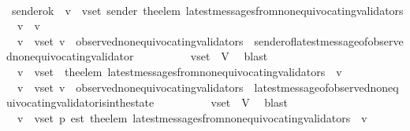 \begin{isabellebody}
\ \ \isamarkupfalse%
\ sender{\isacharunderscore}ok{\isacharcolon}\ {\isachardoublequoteopen}{\isasymforall}\ v\ {\isasymin}\ v{\isacharunderscore}set{\isachardot}\ sender\ {\isacharparenleft}the{\isacharunderscore}elem\ {\isacharparenleft}latest{\isacharunderscore}messages{\isacharunderscore}from{\isacharunderscore}non{\isacharunderscore}equivocating{\isacharunderscore}validators\ {\isasymsigma}\ v{\isacharparenright}{\isacharparenright}\ {\isacharequal}\ v{\isachardoublequoteclose}\ \isanewline
\ \ \ \ \isamarkupfalse%
\ {\isacartoucheopen}{\isasymforall}\ v\ {\isasymin}\ v{\isacharunderscore}set{\isachardot}\ v\ {\isasymin}\ observed{\isacharunderscore}non{\isacharunderscore}equivocating{\isacharunderscore}validators\ {\isasymsigma}{\isacartoucheclose}\ sender{\isacharunderscore}of{\isacharunderscore}latest{\isacharunderscore}message{\isacharunderscore}of{\isacharunderscore}observed{\isacharunderscore}non{\isacharunderscore}equivocating{\isacharunderscore}validator\isanewline
\ \ \ \ \isamarkupfalse%
\ {\isacartoucheopen}{\isasymsigma}\ {\isasymin}\ {\isasymSigma}\ {\isasymand}\ v{\isacharunderscore}set\ {\isasymsubseteq}\ V{\isacartoucheclose}\ \isamarkupfalse%
\ blast\isanewline
\ \ \isamarkupfalse%
\ {\isachardoublequoteopen}{\isasymforall}\ v\ {\isasymin}\ v{\isacharunderscore}set{\isachardot}\ \ the{\isacharunderscore}elem\ {\isacharparenleft}latest{\isacharunderscore}messages{\isacharunderscore}from{\isacharunderscore}non{\isacharunderscore}equivocating{\isacharunderscore}validators\ {\isasymsigma}\ v{\isacharparenright}\ {\isasymin}\ {\isasymsigma}{\isachardoublequoteclose}\isanewline
\ \ \ \ \isamarkupfalse%
\ {\isacartoucheopen}{\isasymforall}\ v\ {\isasymin}\ v{\isacharunderscore}set{\isachardot}\ v\ {\isasymin}\ observed{\isacharunderscore}non{\isacharunderscore}equivocating{\isacharunderscore}validators\ {\isasymsigma}{\isacartoucheclose}\ latest{\isacharunderscore}message{\isacharunderscore}of{\isacharunderscore}observed{\isacharunderscore}non{\isacharunderscore}equivocating{\isacharunderscore}validator{\isacharunderscore}is{\isacharunderscore}in{\isacharunderscore}the{\isacharunderscore}state\isanewline
\ \ \ \ \isamarkupfalse%
\ {\isacartoucheopen}{\isasymsigma}\ {\isasymin}\ {\isasymSigma}\ {\isasymand}\ v{\isacharunderscore}set\ {\isasymsubseteq}\ V{\isacartoucheclose}\ \isamarkupfalse%
\ blast\isanewline
\ \ \isamarkupfalse%
\ \isamarkupfalse%
\ {\isachardoublequoteopen}{\isasymforall}\ v\ {\isasymin}\ v{\isacharunderscore}set{\isachardot}\ p\ {\isacharparenleft}est\ {\isacharparenleft}the{\isacharunderscore}elem\ {\isacharparenleft}latest{\isacharunderscore}messages{\isacharunderscore}from{\isacharunderscore}non{\isacharunderscore}equivocating{\isacharunderscore}validators\ {\isasymsigma}\ v{\isacharparenright}{\isacharparenright}{\isacharparenright}{\isachardoublequoteclose}\isanewline

\end{isabellebody}
